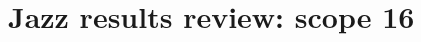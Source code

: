\documentclass{article}
\begin{document}
\section*{Jazz results review: scope 16}


\clearpage

\clearpage

\end{document}
